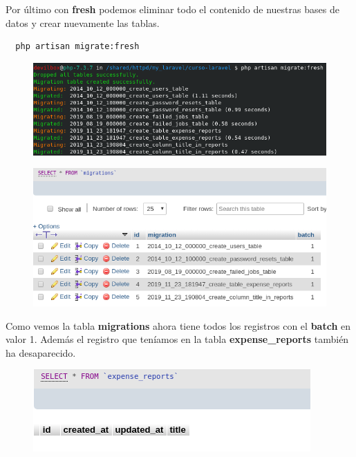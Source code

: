 \documentclass{article}
\begin{document}
Por último con \textbf{fresh} podemos eliminar todo el contenido de nuestras
bases de datos y crear nuevamente las tablas.

\begin{verbatim}
  php artisan migrate:fresh
\end{verbatim}

\begin{figure}[h!]
  \centering
  \includegraphics[scale=0.5]{./Pictures/044_migrate_fresh.png}
\end{figure}

\begin{figure}[h!]
  \centering
  \includegraphics[scale=0.5]{./Pictures/045_migration_fresh.png}
\end{figure}

Como vemos la tabla \textbf{migrations} ahora tiene todos los registros con el
\textbf{batch} en valor 1. Además el registro que teníamos en la tabla
\textbf{expense\_reports} también ha desaparecido.\\

\begin{figure}[h!]
  \centering
  \includegraphics[scale=0.5]{./Pictures/046_expense_report_dropped.png}
\end{figure}
\end{document}
